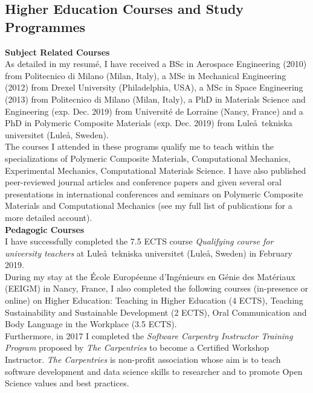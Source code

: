 \documentclass[
  a4paper, 
]{fortysecondscv}
\begin{document}
\subsection{Higher Education Courses and Study Programmes}
\textbf{Subject Related Courses}\\
As detailed in my resum\'e, I have received a BSc in Aerospace Engineering (2010) from Politecnico di Milano (Milan, Italy), a MSc in Mechanical Engineering (2012) from Drexel University (Philadelphia, USA), a MSc in Space Engineering (2013) from Politecnico di Milano (Milan, Italy), a PhD in Materials Science and Engineering (exp. Dec. 2019) from Universit\'e de Lorraine (Nancy, France) and a PhD in Polymeric Composite Materials (exp. Dec. 2019) from Lule\aa\ tekniska universitet (Lule\aa, Sweden).\\The courses I attended in these programs qualify me to teach within the specializations of Polymeric Composite Materials, Computational Mechanics, Experimental Mechanics, Computational Materials Science. I have also published peer-reviewed journal articles and conference papers and given several oral presentations in international conferences and seminars on Polymeric Composite Materials and Computational Mechanics (see my full list of publications for a more detailed account).\\[2pt]
\textbf{Pedagogic Courses}\\
I have successfully completed the 7.5 ECTS course \emph{Qualifying course for university teachers} at Lule\aa\ tekniska universitet (Lule\aa, Sweden) in February 2019.\\During my stay at the \'Ecole Europ\'eenne d'Ing\'enieurs en G\'enie des Mat\'eriaux (EEIGM) in Nancy, France, I also completed the following courses (in-presence or online) on Higher Education: Teaching in Higher Education (4 ECTS), Teaching Sustainability and Sustainable Development (2 ECTS), Oral Communication and Body Language in the Workplace (3.5 ECTS).\\Furthermore, in 2017 I completed the \textit{Software Carpentry Instructor Training Program} proposed by \textit{The Carpentries} to become a Certified Workshop Instructor. \textit{The Carpentries} is non-profit association whose aim is to teach software development and data science skills to researcher and to promote Open Science values and best practices.
\end{document}
